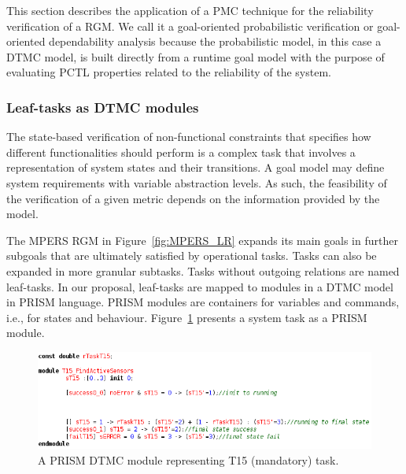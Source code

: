 This section describes the application of a PMC technique for the reliability verification of a RGM. We call it a goal-oriented probabilistic verification or goal-oriented dependability analysis because the probabilistic model, in this case a DTMC model, is built directly from a runtime goal model with the purpose of evaluating PCTL properties related to the reliability of the system. 


\subsubsection{Leaf-tasks as DTMC modules}


The state-based verification of non-functional constraints that specifies how different functionalities should perform is a complex task that involves a representation of system states and their transitions. A goal model may define system requirements with variable abstraction levels. As such, the feasibility of the verification of a given metric depends on the information provided by the model.

The MPERS RGM in Figure~\ref{fig:MPERS_LR} expands its main goals in further subgoals that are ultimately satisfied by operational tasks. Tasks can also be expanded in more granular subtasks. Tasks without outgoing relations are named leaf-tasks. In our proposal, leaf-tasks are mapped to modules in a DTMC model in PRISM language. PRISM modules are containers for variables and commands, i.e., for states and behaviour. Figure~\ref{fig:PRISM_TSK_MODULE} presents a system task as a PRISM module.

\begin{figure}[ht]
\centering
\includegraphics[width=1\textwidth]{imgs/PRISM_TSK_MODULE.png}
\caption{A PRISM DTMC module representing T15 (mandatory) task.}
\label{fig:PRISM_TSK_MODULE}
\end{figure}

